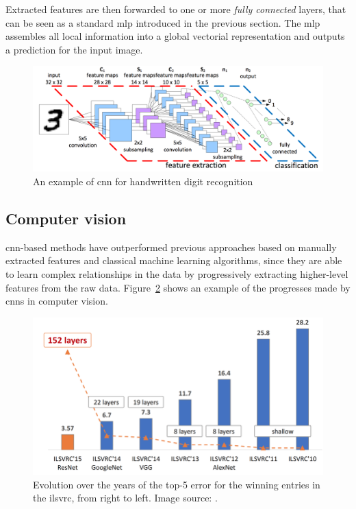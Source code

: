 \documentclass[%
    corpo=12pt,
    twoside,
    stile=classica,   
    tipotesi=magistrale,
    evenboxes,
    english,
	numerazioneromana,
]{toptesi}
\begin{document}
\medskip
Extracted features are then forwarded to one or more \textit{fully connected} layers, that can be seen as a standard \gls{mlp} introduced in the previous section. The \gls{mlp} assembles all local information into a global vectorial representation and outputs a prediction for the input image.

\begin{figure}
	\centering
	\includegraphics[width=.9\linewidth]{imgs/cnn.png}
	\caption{An example of \gls{cnn} for handwritten digit recognition}
	\label{fig:cnn}
\end{figure}

\subsection{Computer vision}
\Gls{cnn}-based methods have outperformed previous approaches based on manually extracted features and classical machine learning algorithms, since they are able to learn complex relationships in the data by progressively extracting higher-level features from the raw data. Figure~\ref{fig:imagenet} shows an example of the progresses made by \glspl{cnn} in computer vision.

\begin{figure}[ht]
	\centering
	\includegraphics[width=.8\textwidth]{imgs/ILSVRC.png}
	\caption[Evolution of top-5 error for the winning entries in \gls{ilsvrc}]{Evolution over the years of the top-5 error for the winning entries in the \gls{ilsvrc}, from right to left\cite{russakovsky2015imagenet}. Image source: \cite{hanqing2020research}.
	\label{fig:imagenet}}
\end{figure}
\end{document}
